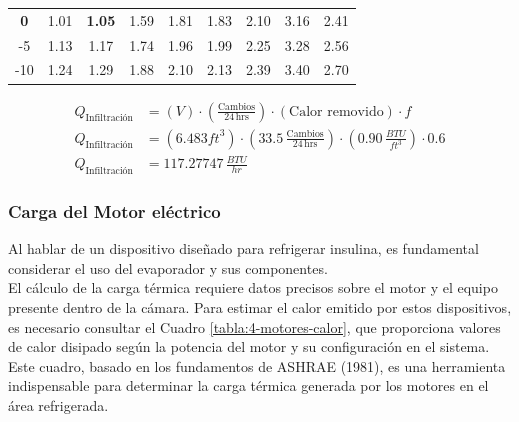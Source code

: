 \begin{table}[H]
\begin{tabular}{ccccccccc}
 			{\color[HTML]{DA8292} \textbf{0}}                                                                             & 1.01 & {\color[HTML]{DA8292} \textbf{1.05}} & 1.59       & 1.81      & 1.83       & 2.10      & 3.16       & 2.41       \\
 			-5                                                                                                            & 1.13 & 1.17                                 & 1.74       & 1.96      & 1.99       & 2.25      & 3.28       & 2.56       \\
 			-10                                                                                                           & 1.24 & 1.29                                 & 1.88       & 2.10      & 2.13       & 2.39      & 3.40       & 2.70       \\ \hline
 		\end{tabular}
 	\end{table}
 	
 	
 	
 	\begin{equation}
 		\begin{aligned}
 			Q_{\text{Infiltración}} &= (V) \cdot \left( \frac{\text{Cambios}}{24 \, \text{hrs}} \right) \cdot (\text{Calor removido}) \cdot f \\
 			Q_{\text{Infiltración}} &= (6.483 {ft}^3) \cdot \left( 33.5 \, \frac{\text{Cambios}}{24 \, \text{hrs}} \right) \cdot \left(0.90  \, \frac{{BTU}}{{ft}^3} \right) \cdot 0.6 \\
 			Q_{\text{Infiltración}} &=117.27747\, \frac{{BTU}}{{hr}}
 		\end{aligned}
 	\end{equation}
 	
 	
 	
 	\subsubsection{Carga del Motor eléctrico}
 	
 Al hablar de un dispositivo diseñado para refrigerar insulina, es fundamental considerar el uso del evaporador y sus componentes. \\
El cálculo de la carga térmica requiere datos precisos sobre el motor y el equipo presente dentro de la cámara. Para estimar el calor emitido por estos dispositivos, es necesario consultar el Cuadro \ref{tabla:4-motores-calor}, que proporciona valores de calor disipado según la potencia del motor y su configuración en el sistema. Este cuadro, basado en los fundamentos de ASHRAE (1981), es una herramienta indispensable para determinar la carga térmica generada por los motores en el área refrigerada. 	
 
